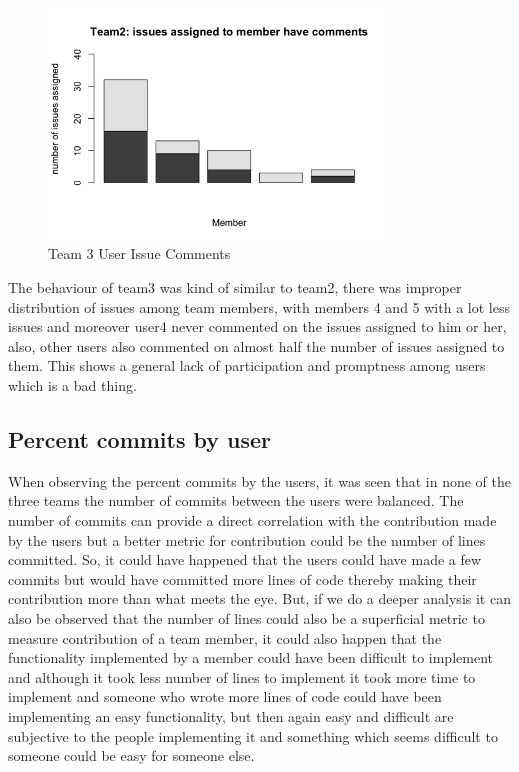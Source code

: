 \documentclass[conference]{IEEEtran}
\begin{document}
\begin{figure}[H]
    \centering
    \includegraphics[width=9cm]{../AprilProject/pic/team3_user_issue_comments.png}
    \caption{Team 3 User Issue Comments}
    \label{team3_issue_comment}
\end{figure}

The behaviour of team3 was kind of similar to team2, there was improper distribution of issues among team members, with members 4 and 5 with a lot less issues and moreover user4 never commented on the issues assigned to him or her, also, other users also commented on almost half the number of issues assigned to them. This shows a general lack of participation and promptness among users which is a bad thing.

\subsection{Percent commits by user}
When observing the percent commits by the users, it was seen that in none of the three teams the number of commits between the users were balanced. The number of commits can provide a direct correlation with the contribution made by the users but a better metric for contribution could be the number of lines committed. So, it could have happened that the users could have made a few commits but would have committed more lines of code thereby making their contribution more than what meets the eye. But, if we do a deeper analysis it can also be observed that the number of lines could also be a superficial metric to measure contribution of a team member, it could also happen that the functionality implemented by a member could have been difficult to implement and although it took less number of lines to implement it took more time to implement and someone who wrote more lines of code could have been implementing an easy functionality, but then again easy and difficult are subjective to the people implementing it and something which seems difficult to someone could be easy for someone else. 
\end{document}
